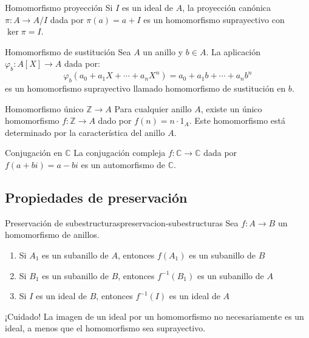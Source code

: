 \begin{example}{Homomorfismo proyección}{}
    Si \(I\) es un ideal de \(A\), la proyección canónica \(\pi: A \to A/I\) dada por \(\pi(a) = a + I\) es un homomorfismo suprayectivo con \(\ker \pi = I\).
\end{example}

\begin{example}{Homomorfismo de sustitución}{}
    Sea \(A\) un anillo y \(b \in A\). La aplicación \(\varphi_b: A[X] \to A\) dada por:
    \[
    \varphi_b(a_0 + a_1X + \cdots + a_nX^n) = a_0 + a_1b + \cdots + a_nb^n
    \]
    es un homomorfismo suprayectivo llamado {homomorfismo de sustitución} en \(b\).
\end{example}

\begin{example}{Homomorfismo único \(\mathbb{Z} \to A\)}{}
    Para cualquier anillo \(A\), existe un único homomorfismo \(f: \mathbb{Z} \to A\) dado por \(f(n) = n \cdot 1_A\). Este homomorfismo está determinado por la característica del anillo \(A\).
\end{example}

\begin{example}{Conjugación en \(\mathbb{C}\)}{}
    La conjugación compleja \(f: \mathbb{C} \to \mathbb{C}\) dada por \(f(a + bi) = a - bi\) es un automorfismo de \(\mathbb{C}\).
\end{example}

\subsection{Propiedades de preservación}

\begin{proposition}{Preservación de subestructuras}{preservacion-subestructuras}
    Sea \(f: A \to B\) un homomorfismo de anillos.
    \begin{enumerate}
        \item Si \(A_1\) es un subanillo de \(A\), entonces \(f(A_1)\) es un subanillo de \(B\)
        \item Si \(B_1\) es un subanillo de \(B\), entonces \(f^{-1}(B_1)\) es un subanillo de \(A\)
        \item Si \(I\) es un ideal de \(B\), entonces \(f^{-1}(I)\) es un ideal de \(A\)
    \end{enumerate}
\end{proposition}

\begin{remark}
    {¡Cuidado!} La imagen de un ideal por un homomorfismo no necesariamente es un ideal, a menos que el homomorfismo sea suprayectivo.
\end{remark}

